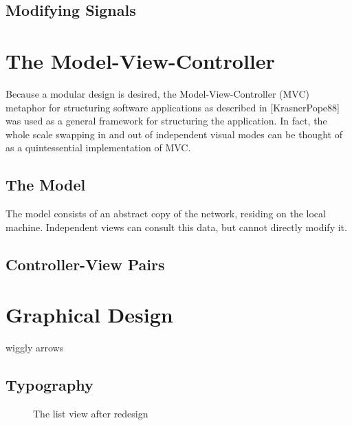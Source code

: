 \subsection{Modifying Signals}

\section{The Model-View-Controller}
\label{sec:MVC}

	Because a modular design is desired, the Model-View-Controller (MVC) metaphor for structuring software applications as described in [KrasnerPope88] was used as a general framework for structuring the application. In fact, the whole scale swapping in and out of independent visual modes can be thought of as a quintessential implementation of MVC. 
	
\subsection{The Model}

	The model consists of an abstract copy of the network, residing on the local machine. Independent views can consult this data, but cannot directly modify it.


\subsection{Controller-View Pairs}

\section{Graphical Design}
	wiggly arrows
\subsection{Typography}

\begin{figure}[ht]
\centering
\caption{The list view after redesign} %
\label{fig:before_makeover}
\end{figure}

